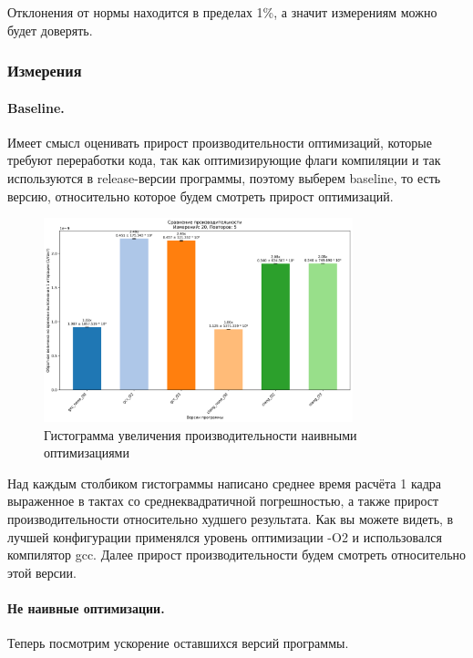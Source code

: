 \documentclass[12pt,a4paper]{article}
\begin{document}
Отклонения от нормы находится в пределах 1\%, а значит измерениям можно будет доверять.

\subsubsection{Измерения}

\paragraph{Baseline.} Имеет смысл оценивать прирост производительности оптимизаций, которые требуют переработки кода, так как оптимизирующие флаги компиляции и так используются в release-версии программы, поэтому выберем baseline, то есть версию, относительно которое будем смотреть прирост оптимизаций.

\begin{figure}[ht!]
    \centering
    \includegraphics[width=0.8\textwidth]{histogram0.png}
    \caption{Гистограмма увеличения производительности наивными оптимизациями}
    \label{fig:histogram0}
\end{figure}

Над каждым столбиком гистограммы написано среднее время расчёта 1 кадра выраженное в тактах со среднеквадратичной погрешностью, а также прирост производительности относительно худшего результата. Как вы можете видеть, в лучшей конфигурации применялся уровень оптимизации -O2 и использовался компилятор gcc. Далее прирост производительности будем смотреть относительно этой версии.

\paragraph{Не наивные оптимизации.} Теперь посмотрим ускорение оставшихся версий программы.
\end{document}
